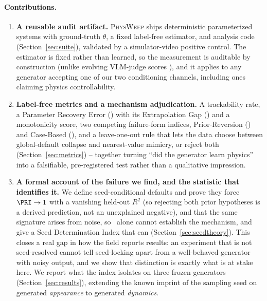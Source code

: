 \documentclass[10pt,twocolumn,letterpaper]{article}
\begin{document}
\paragraph{Contributions.}
\begin{enumerate}[leftmargin=1.4em,itemsep=1pt,topsep=2pt]
  \item \textbf{A reusable audit artifact.} \textsc{PhysWeep} ships
  deterministic parameterized systems with ground-truth $\theta$, a fixed
  label-free estimator, and analysis code (Section~\ref{sec:suite}),
  validated by a simulator-video positive control. The estimator is fixed
  rather than learned, so the measurement is auditable by construction
  (unlike evolving VLM-judge scores \citep{phyground2026}), and it applies
  to any generator accepting one of our two conditioning channels,
  including ones claiming physics controllability.
  \item \textbf{Label-free metrics and a mechanism adjudication.} A
  trackability rate, a Parameter Recovery Error (\PRE) with its
  Extrapolation Gap (\EG) and a monotonicity score, two competing
  failure-form indices, Prior-Reversion (\PRI) and Case-Based (\CBI), and a
  leave-one-out rule that lets the data choose between global-default
  collapse and nearest-value mimicry, or reject both
  (Section~\ref{sec:metrics}) -- together turning ``did the generator
  learn physics'' into a falsifiable, pre-registered test rather than a
  qualitative impression.
  \item \textbf{A formal account of the failure we find, and the statistic
  that identifies it.} We define seed-conditional defaults and prove they
  force $\PRI\to1$ with a vanishing held-out $R^2$ (so rejecting both prior
  hypotheses is a derived prediction, not an unexplained negative), and that
  the same signature arises from noise, so \PRI\ alone cannot establish the
  mechanism, and give a Seed Determination Index that can
  (Section~\ref{sec:seedtheory}). This closes a real gap in how the field
  reports results: an experiment that is not seed-resolved cannot tell
  seed-locking apart from a well-behaved generator with noisy output, and
  we show that distinction is exactly what is at stake here. We report
  what the index isolates on three frozen generators
  (Section~\ref{sec:results}), extending the known
  imprint of the sampling seed on generated \emph{appearance}
  \citep{xu2025goodseed} to generated \emph{dynamics}.
\end{enumerate}

\end{document}
